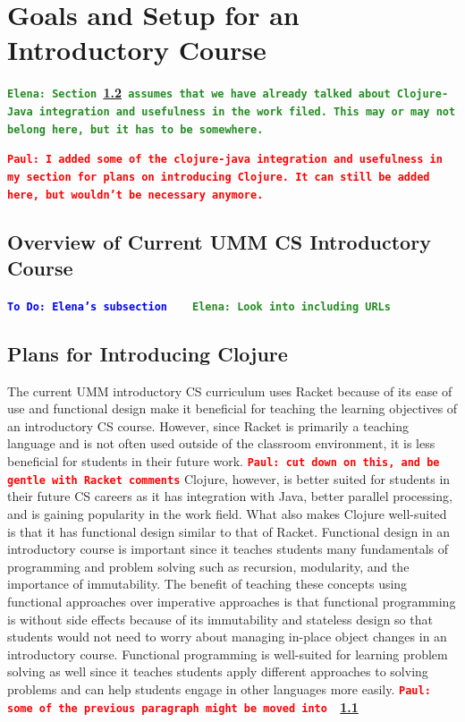 \documentclass[12pt]{article}
\newcommand{\comment}[1]{{\bf \tt  {#1}}}
\newcommand{\emcomment}[1]{\textcolor{ForestGreen}{\comment{Elena: {#1}}}}
\newcommand{\todo}[1]{\textcolor{blue}{\comment{To Do: {#1}}}}
\newcommand{\pscomment}[1]{\textcolor{red}{\comment{Paul: {#1}}}}
\begin{document}
\section{Goals and Setup for an Introductory Course}\label{sec:racket-clojure}
\emcomment{Section~\ref{subsec:plans} assumes that we have already talked about Clojure-Java integration and usefulness in the work filed. This may or may not belong here, but it has to be somewhere.}

\pscomment{I added some of the clojure-java integration and usefulness in my section for plans on introducing Clojure.  It can still be added here, but wouldn't be necessary anymore.}

\subsection{Overview of Current UMM CS Introductory Course}\label{subsec:course}
\todo{Elena's subsection}
~\cite{htdp}
~\cite{lein} \emcomment{Look into including URLs}

\subsection{Plans for Introducing Clojure}\label{subsec:plans}
The current UMM introductory CS curriculum uses Racket because of its ease of use and functional design make it beneficial for teaching the learning objectives of an introductory CS course.  However, since Racket is primarily a teaching language and is not often used outside of the classroom environment, it is less beneficial for students in their future work. \pscomment{cut down on this, and be gentle with Racket comments} 
Clojure, however, is better suited for students in their future CS careers as it has integration with Java, better parallel processing, and is gaining popularity in the work field. What also makes Clojure well-suited is that it has functional design similar to that of Racket. Functional design in an introductory course is important since it teaches students many fundamentals of programming and problem solving such as recursion, modularity, and the importance of immutability. The benefit of teaching these concepts using functional approaches over imperative approaches is that functional programming is without side effects because of its immutability and stateless design so that students would not need to worry about managing in-place object changes in an introductory course. Functional programming is well-suited for learning problem solving as well since it teaches students apply different approaches to solving problems and can help students engage in other languages more easily.
\pscomment{some of the previous paragraph might be moved into ~\ref{subsec:course}}
\end{document}

